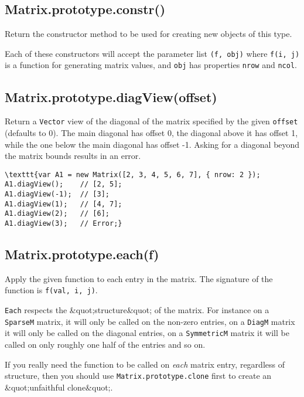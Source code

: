 \documentclass{article}
\begin{document}
    \subsection*{Matrix.prototype.constr()}
    Return the constructor method to be used for creating new objects of
this type.


Each of these constructors will accept the parameter list \texttt{(f, obj)}
where \texttt{f(i, j)} is a function for generating matrix values, and \texttt{obj}
has properties \texttt{nrow} and \texttt{ncol}.


    \subsection*{Matrix.prototype.diagView(offset)}
    Return a \texttt{Vector} view of the diagonal of the matrix specified by
the given \texttt{offset} (defaults to 0). The main diagonal has offset 0, the diagonal
above it has offset 1, while the one below the main diagonal has offset -1.
Asking for a diagonal beyond the matrix bounds results in an error.


\begin{lstlisting}
\texttt{var A1 = new Matrix([2, 3, 4, 5, 6, 7], { nrow: 2 });
A1.diagView();    // [2, 5];
A1.diagView(-1);  // [3];
A1.diagView(1);   // [4, 7];
A1.diagView(2);   // [6];
A1.diagView(3);   // Error;}\end{lstlisting}

    \subsection*{Matrix.prototype.each(f)}
    Apply the given function to each entry in the matrix. The signature of the
function is \texttt{f(val, i, j)}.


\texttt{Each} respects the \&quot;structure\&quot; of the matrix. For instance
on a \texttt{SparseM} matrix, it will only be called on the non-zero entries, on a
\texttt{DiagM} matrix it will only be called on the diagonal entries, on a \texttt{SymmetricM}
matrix it will be called on only roughly one half of the entries and so on.


If you really need the function to be called on \emph{each} matrix entry, regardless of
structure, then you should use \texttt{Matrix.prototype.clone} first to create an
\&quot;unfaithful clone\&quot;.
\end{document}
